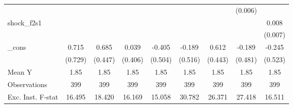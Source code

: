 {\begin{tabular}{l*{8}{c}}
            &                     &                     &                     &                     &                     &                     &     (0.006)         &                     \\
\addlinespace
shock\_f2s1  &                     &                     &                     &                     &                     &                     &                     &       0.008         \\
            &                     &                     &                     &                     &                     &                     &                     &     (0.007)         \\
\addlinespace
\_cons      &       0.715         &       0.685         &       0.039         &      -0.405         &      -0.189         &       0.612         &      -0.189         &      -0.245         \\
            &     (0.729)         &     (0.447)         &     (0.406)         &     (0.504)         &     (0.516)         &     (0.443)         &     (0.481)         &     (0.523)         \\
\midrule
Mean Y      &        1.85         &        1.85         &        1.85         &        1.85         &        1.85         &        1.85         &        1.85         &        1.85         \\
Observations&         399         &         399         &         399         &         399         &         399         &         399         &         399         &         399         \\
Exc. Inst. F-stat&      16.495         &      18.420         &      16.169         &      15.058         &      30.782         &      26.371         &      27.418         &      16.511         \\
\bottomrule
\end{tabular}
}
